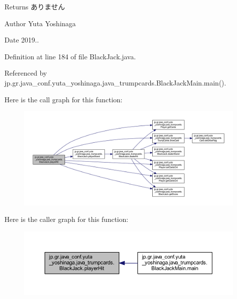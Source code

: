 \begin{DoxyReturn}{Returns}
ありません 
\end{DoxyReturn}
\begin{DoxyAuthor}{Author}
Yuta Yoshinaga 
\end{DoxyAuthor}
\begin{DoxyDate}{Date}
2019.. 
\end{DoxyDate}


Definition at line 184 of file Black\+Jack.\+java.



Referenced by jp.\+gr.\+java\+\_\+conf.\+yuta\+\_\+yoshinaga.\+java\+\_\+trumpcards.\+Black\+Jack\+Main.\+main().

Here is the call graph for this function\+:
\nopagebreak
\begin{figure}[H]
\begin{center}
\leavevmode
\includegraphics[width=350pt]{classjp_1_1gr_1_1java__conf_1_1yuta__yoshinaga_1_1java__trumpcards_1_1_black_jack_a4b8f2248ac868b5d3b9506fb0ece0ea2_cgraph}
\end{center}
\end{figure}
Here is the caller graph for this function\+:
\nopagebreak
\begin{figure}[H]
\begin{center}
\leavevmode
\includegraphics[width=350pt]{classjp_1_1gr_1_1java__conf_1_1yuta__yoshinaga_1_1java__trumpcards_1_1_black_jack_a4b8f2248ac868b5d3b9506fb0ece0ea2_icgraph}
\end{center}
\end{figure}
\mbox{\label{classjp_1_1gr_1_1java__conf_1_1yuta__yoshinaga_1_1java__trumpcards_1_1_black_jack_a53f37ae6f1388143c70a8b138c6c2443}} 
